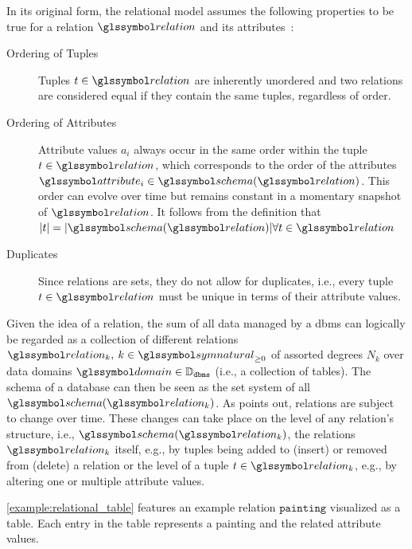 In its original form, the relational model assumes the following properties to be true for a relation $\relation$ and its attributes~\cite{Codd:1970Relational}:

\begin{description}
    \item[Ordering of Tuples] Tuples $t \in \relation$ are inherently unordered and two relations are considered equal if they contain the same tuples, regardless of order.
    \item[Ordering of Attributes] Attribute values $a_{i}$ always occur in the same order within the tuple $t \in \relation$, which corresponds to the order of the attributes $\attribute_i \in \schema(\relation)$. This order can evolve over time but remains constant in a momentary snapshot of $\relation$. It follows from the definition that $|t| = |\schema(\relation)| \forall t \in \relation$
    \item[Duplicates] Since relations are sets, they do not allow for duplicates, i.e., every tuple $t \in \relation$ must be unique in terms of their attribute values.
\end{description}

Given the idea of a relation, the sum of all data managed by a \acrshort{dbms} can logically be regarded as a collection of different relations $\relation_k, \: k \in \symnatural_{\geq 0}$ of assorted degrees $N_k$ over data domains $\domain \in \mathbb{D}_{\mathtt{dbms}}$ (i.e., a collection of tables). The schema of a database can then be seen as the set system of all $\schema(\relation_k)$. As \cite{Codd:1970Relational} points out, relations are subject to change over time. These changes can take place on the level of any relation's structure, i.e., $\schema(\relation_k)$, the relations $\relation_k$ itself, e.g., by tuples being added to (insert) or removed from (delete) a relation or the level of a tuple $t \in \relation_k$, e.g., by altering one or multiple attribute values.

\cref{example:relational_table} features an example relation $\mathtt{painting}$ visualized as a table. Each entry in the table represents a painting and the related attribute values.


